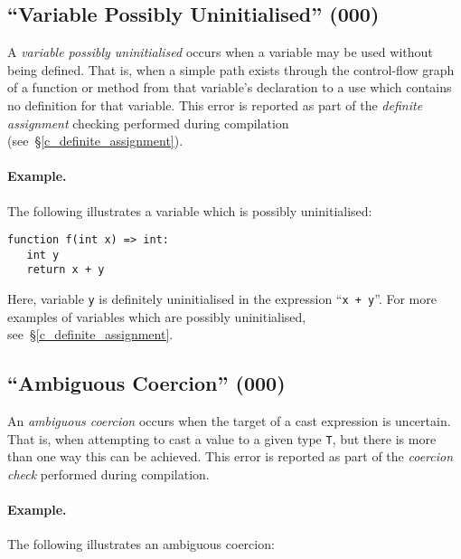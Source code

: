 

\subsection{``Variable Possibly Uninitialised'' (000)}
\label{c_err_var_uninitialised}
A {\em variable possibly uninitialised} occurs when a variable may be used without being defined.  That is, when a simple path exists through the control-flow graph of a function or method from that variable's declaration to a use which contains no definition for that variable.  This error is reported as part of the {\em definite assignment} checking performed during compilation (see~\S\ref{c_definite_assignment}).

\paragraph{Example.}  The following illustrates a variable which is possibly uninitialised:

\begin{lstlisting}
function f(int x) => int:
   int y
   return x + y
\end{lstlisting}

Here, variable \lstinline{y} is definitely uninitialised in the expression ``\lstinline{x + y}''.  For more examples of variables which are possibly uninitialised, see~\S\ref{c_definite_assignment}.

\subsection{``Ambiguous Coercion'' (000)}

An {\em ambiguous coercion} occurs when the target of a cast expression is uncertain.  That is, when attempting to cast a value to a given type \lstinline{T}, but there is more than one way this can be achieved.  This error is reported as part of the {\em coercion check} performed during compilation.

\paragraph{Example.}  The following illustrates an ambiguous coercion:

